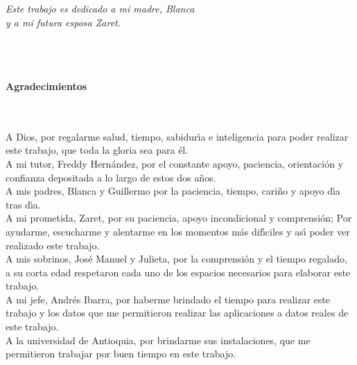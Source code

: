 \begin{flushright}
\begin{minipage}{12cm}
    \noindent
        \small
				\textsl{Este trabajo es dedicado a mi madre, Blanca\\
				y a mi futura esposa Zaret.}\\
\end{minipage}
\end{flushright}

\newpage{\pagestyle{empty}\cleardoublepage}

\newpage
\thispagestyle{empty} \textbf{}\normalsize
\\\\\\%
\textbf{\LARGE Agradecimientos}
\\\\

A Dios, por regalarme salud, tiempo, sabidur\'{\i}a e inteligencia para poder realizar este trabajo, que toda la gloria sea para \'{e}l.\\

A mi tutor, Freddy Hern\'{a}ndez, por el constante apoyo, paciencia, orientaci\'{o}n y confianza depositada a lo largo de estos dos a\~{n}os.\\

A mis padres, Blanca y Guillermo por la paciencia, tiempo, cari\~{n}o y apoyo d\'{\i}a tras d\'{\i}a.\\

A mi prometida, Zaret, por su paciencia, apoyo incondicional y comprensi\'{o}n; Por ayudarme, escucharme y alentarme en los momentos m\'{a}s dif\'{\i}ciles y as\'{\i} poder ver realizado este trabajo.\\

A mis sobrinos, Jos\'{e} Manuel y Julieta, por la comprensi\'{o}n y el tiempo regalado, a su corta edad respetaron cada uno de los espacios necesarios para elaborar este trabajo.\\

A mi jefe, Andr\'{e}s Ibarra, por haberme brindado el tiempo para realizar este trabajo y los datos que me permitieron realizar las aplicaciones a datos reales de este trabajo.\\

A la universidad de Antioquia, por brindarme sus instalaciones, que me permitieron trabajar por buen tiempo en este trabajo. 

\newpage{\pagestyle{empty}\cleardoublepage}

